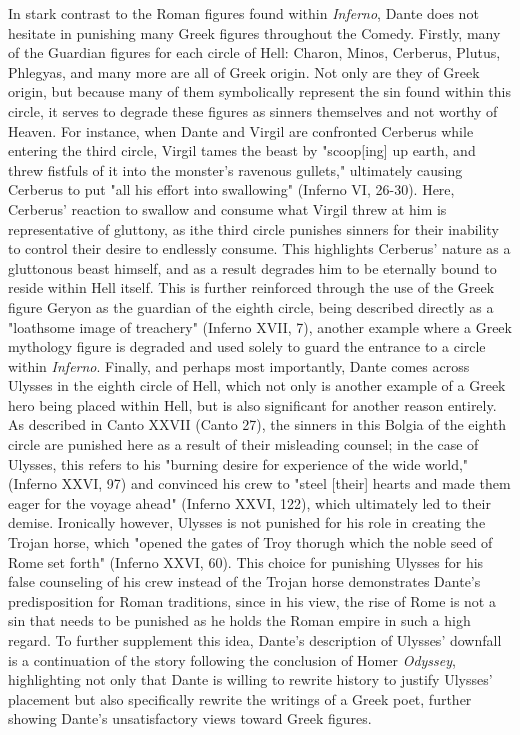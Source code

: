 \documentclass[12pt]{article}
\begin{document}
	In stark contrast to the Roman figures found within \textit{Inferno}, Dante does not hesitate in punishing many Greek figures
	throughout the Comedy. Firstly, many of the Guardian figures for each circle of Hell: Charon, Minos, Cerberus, Plutus, 
	Phlegyas, and many more are all of Greek origin. Not only are they of Greek origin, but because many of them symbolically 
	represent the sin found within this circle, it serves to degrade these figures as sinners themselves and not worthy of 
	Heaven. For instance, when Dante and Virgil are confronted Cerberus while entering the third circle, Virgil tames the beast 
	by "scoop[ing] up earth, and threw fistfuls of it into the monster's ravenous gullets," ultimately causing Cerberus to 
	put "all his effort into swallowing" (Inferno VI, 26-30). Here, Cerberus' reaction to swallow and consume what Virgil threw 
	at him is representative of gluttony, as ithe third circle punishes sinners for their inability to control their desire to 
	endlessly consume. This highlights Cerberus' nature as a gluttonous beast himself, and as a result degrades him to be 
	eternally bound to reside within Hell itself. This is further reinforced through the use of the Greek figure Geryon as the 
	guardian of the eighth
	circle, being described directly as a "loathsome image of treachery" (Inferno XVII, 7), another example where a Greek 
	mythology figure is degraded and used solely to guard the entrance to a circle within \textit{Inferno}. Finally, and 
	perhaps most importantly, Dante comes across Ulysses in the eighth circle of Hell, which not only is another example of a
	Greek hero being placed within Hell, but is also significant for another reason entirely. As described in Canto 
	XXVII (Canto 27), the sinners in this Bolgia of the eighth circle are punished here as a result of their misleading counsel; 
	in the case of Ulysses, this refers to his "burning desire for experience of the wide world," (Inferno XXVI, 97) and
	convinced his crew to 
	"steel [their] hearts and made them eager for the voyage ahead" (Inferno XXVI, 122), which ultimately led to their demise. 
	Ironically however, Ulysses is not punished for his role in creating the Trojan horse, which "opened the gates of Troy thorugh 
	which the noble seed of Rome set forth" (Inferno XXVI, 60). This choice for punishing Ulysses for his false counseling of 
	his crew instead of the Trojan horse demonstrates Dante's predisposition for Roman traditions, since in his view, the rise of 
	Rome is not a sin that needs to be punished as he holds the Roman empire in such a high regard. To further supplement this 
	idea, Dante's description of Ulysses' downfall is a continuation of the story following 
	the conclusion of Homer \textit{Odyssey}, highlighting not only that Dante is willing to rewrite history to justify Ulysses' 
	placement but also specifically rewrite the writings of a Greek poet, further showing Dante's unsatisfactory views toward 
	Greek figures. 
\end{document}
